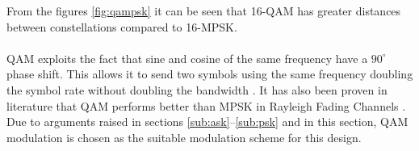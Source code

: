 \documentclass[11pt]{report}
\begin{document}
From the figures \ref{fig:qampsk} it can be seen that 16-QAM has greater distances between constellations compared to 16-MPSK.
\\
\\
QAM exploits the fact that sine and cosine of the same frequency have a $90^{\circ}$  phase shift. This allows it to send two symbols using the same frequency doubling the symbol rate without doubling the bandwidth \cite{68}. It has also been proven in literature that QAM performs better than MPSK in Rayleigh Fading Channels \cite{67,65,66}. Due to arguments raised in sections \ref{sub:ask}--\ref{sub:psk} and in this section, QAM modulation is chosen as the suitable modulation scheme for this design.



\end{document}
